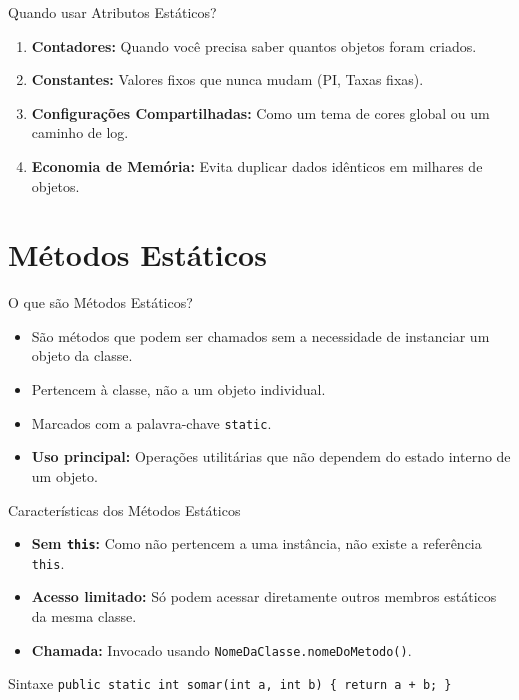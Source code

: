 \documentclass[9pt]{beamer}
\begin{document}
\begin{frame}{Quando usar Atributos Estáticos?}
    \begin{enumerate}
        \item \textbf{Contadores:} Quando você precisa saber quantos objetos foram criados.
        \item \textbf{Constantes:} Valores fixos que nunca mudam (PI, Taxas fixas).
        \item \textbf{Configurações Compartilhadas:} Como um tema de cores global ou um caminho de log.
        \item \textbf{Economia de Memória:} Evita duplicar dados idênticos em milhares de objetos.
    \end{enumerate}
\end{frame}

\section{Métodos Estáticos}

\begin{frame}{O que são Métodos Estáticos?}
    \begin{itemize}
        \item São métodos que podem ser chamados sem a necessidade de instanciar um objeto da classe.
        \item Pertencem à classe, não a um objeto individual.
        \item Marcados com a palavra-chave \texttt{static}.
        \item \textbf{Uso principal:} Operações utilitárias que não dependem do estado interno de um objeto.
    \end{itemize}
\end{frame}

\begin{frame}{Características dos Métodos Estáticos}
    \begin{itemize}
        \item \textbf{Sem \texttt{this}:} Como não pertencem a uma instância, não existe a referência \texttt{this}.
        \item \textbf{Acesso limitado:} Só podem acessar diretamente outros membros estáticos da mesma classe.
        \item \textbf{Chamada:} Invocado usando \texttt{NomeDaClasse.nomeDoMetodo()}.
    \end{itemize}
    \begin{exampleblock}{Sintaxe}
        \texttt{public static int somar(int a, int b) \{ return a + b; \}}
    \end{exampleblock}
\end{frame}
\end{document}
